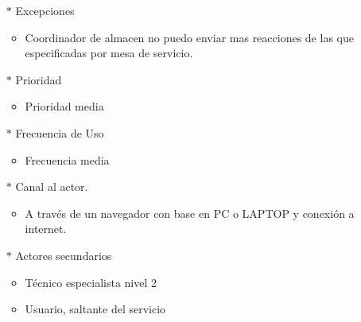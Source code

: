 \begin{multicols}{2}
\begin{itemize}
\begin{itemize}
		\end{itemize}
		\item[$*$]  Excepciones
		\begin{itemize}
			\item Coordinador de almacen no puedo enviar mas reacciones de las que especificadas por mesa de servicio.		
		\end{itemize}
		\item[$*$]  Prioridad 
	\begin{itemize}
		\item Prioridad media 
	\end{itemize}
	\item[$*$]  Frecuencia de Uso
	\begin{itemize}
		\item Frecuencia media
	\end{itemize}
	\item[$*$]   Canal al actor.
	\begin{itemize}
		\item 	A través de un navegador con base en PC o LAPTOP y conexión a internet.
	\end{itemize}
	\item[$*$]  Actores secundarios
	\begin{itemize}
		\item Técnico especialista nivel 2
		\item Usuario, saltante del servicio
		
	\end{itemize}
\end{itemize}

\end{multicols}



